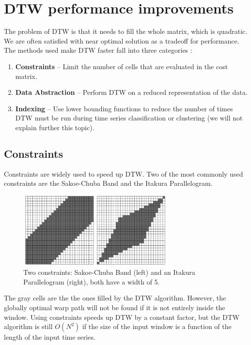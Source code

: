 \section{DTW performance improvements}

The problem of DTW is that it needs to fill the whole matrix, which is quadratic. We are often
satisfied with near optimal solution as a tradeoff for performance. The methods used make DTW
faster fall into three categories \cite{toward_accurate__dtw}:

\begin{enumerate}
  \item \textbf{Constraints} – Limit the number of cells that are
  evaluated in the cost matrix.
  \item  \textbf{Data Abstraction} – Perform DTW on a reduced
  representation of the data.
  \item  \textbf{Indexing} – Use lower bounding functions to reduce the number of times DTW must be
  run during time series classification or clustering (we will not explain further this topic).
\end{enumerate}

\subsection{Constraints}

Constraints are widely used to speed up DTW. Two of the most commonly used constraints are the
Sakoe-Chuba Band and the Itakura Parallelogram.

\begin{figure}[H]
  \centerline{\includegraphics[width=0.7\textwidth]{images/constraints.png}}
  \caption[Two constraints: Sakoe-Chuba Band (left) and an Itakura Parallelogram (right), both have
  a width of 5.]{Two constraints: Sakoe-Chuba Band (left) and an Itakura Parallelogram (right), both
  have a width of 5.}
  \label{obr:constraints}
\end{figure}

The gray cells are the the ones filled by the DTW algorithm. However, the globally optimal warp path
will not be found if it is not entirely inside the window. Using constraints speeds up DTW by a
constant factor, but the DTW algorithm is still $O(N^2)$ if the size of the input window is a
function of the length of the input time series.

